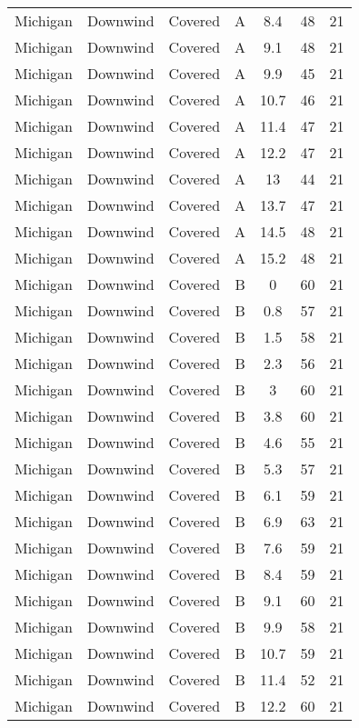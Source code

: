 \documentclass{article}
\begin{document}
\begin{longtable}[H]{ccccccc}
Michigan & Downwind & Covered     & A & 8.4  & 48 & 21 \\
Michigan & Downwind & Covered     & A & 9.1  & 48 & 21 \\
Michigan & Downwind & Covered     & A & 9.9  & 45 & 21 \\
Michigan & Downwind & Covered     & A & 10.7 & 46 & 21 \\
Michigan & Downwind & Covered     & A & 11.4 & 47 & 21 \\
Michigan & Downwind & Covered     & A & 12.2 & 47 & 21 \\
Michigan & Downwind & Covered     & A & 13   & 44 & 21 \\
Michigan & Downwind & Covered     & A & 13.7 & 47 & 21 \\
Michigan & Downwind & Covered     & A & 14.5 & 48 & 21 \\
Michigan & Downwind & Covered     & A & 15.2 & 48 & 21 \\
Michigan & Downwind & Covered     & B & 0    & 60 & 21 \\
Michigan & Downwind & Covered     & B & 0.8  & 57 & 21 \\
Michigan & Downwind & Covered     & B & 1.5  & 58 & 21 \\
Michigan & Downwind & Covered     & B & 2.3  & 56 & 21 \\
Michigan & Downwind & Covered     & B & 3    & 60 & 21 \\
Michigan & Downwind & Covered     & B & 3.8  & 60 & 21 \\
Michigan & Downwind & Covered     & B & 4.6  & 55 & 21 \\
Michigan & Downwind & Covered     & B & 5.3  & 57 & 21 \\
Michigan & Downwind & Covered     & B & 6.1  & 59 & 21 \\
Michigan & Downwind & Covered     & B & 6.9  & 63 & 21 \\
Michigan & Downwind & Covered     & B & 7.6  & 59 & 21 \\
Michigan & Downwind & Covered     & B & 8.4  & 59 & 21 \\
Michigan & Downwind & Covered     & B & 9.1  & 60 & 21 \\
Michigan & Downwind & Covered     & B & 9.9  & 58 & 21 \\
Michigan & Downwind & Covered     & B & 10.7 & 59 & 21 \\
Michigan & Downwind & Covered     & B & 11.4 & 52 & 21 \\
Michigan & Downwind & Covered     & B & 12.2 & 60 & 21 \\

\end{longtable}
\end{document}
